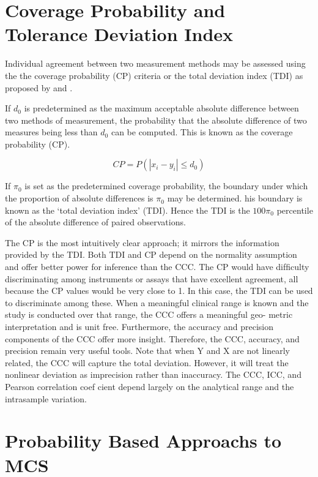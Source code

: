 \documentclass[12pt, a4paper]{report}
\theoremstyle{plain}
\theoremstyle{definition}
\theoremstyle{remark}
\begin{document}
\section{Coverage Probability and Tolerance Deviation Index}

Individual agreement between two measurement methods may be
assessed using the the coverage probability (CP) criteria or the
total deviation index (TDI) as proposed by \citet{lin2000} and
\citet{lin2002}.

If $d_{0}$ is predetermined as the maximum acceptable absolute
difference between two methods of measurement, the probability
that the absolute difference of two measures being less than
$d_{0}$ can be computed. This is known as the coverage probability
(CP).

\begin{equation}
CP = P(|x_{i} - y_{i}| \leq d_{0})
\end{equation}

If $\pi_{0}$ is set as the predetermined coverage probability, the
boundary under which the proportion of absolute differences is
$\pi_{0}$ may be determined. his boundary is known as the `total
deviation index' (TDI). Hence the TDI is the $100\pi_{0}$
percentile of the absolute difference of paired observations.


The CP is the most intuitively clear approach; it mirrors the information provided by the TDI. 
Both TDI and CP depend on the normality assumption and offer better power
for inference than the CCC. The CP would have difficulty discriminating among instruments or 
assays that have excellent agreement, all because the CP values would be very close to
1. In this case, the TDI can be used to discriminate among these. When a meaningful clinical range is known and the study is conducted over that range, the CCC offers a meaningful geo- metric interpretation and is unit free. Furthermore, the accuracy and precision components of the CCC offer more insight. Therefore, the CCC, accuracy, and precision remain very useful tools. Note that when Y and X are not linearly related, the CCC will capture the total deviation. However, it will treat the nonlinear deviation as imprecision rather than inaccuracy. The CCC, ICC, and Pearson correlation coef cient depend
largely on the analytical range and the intrasample variation.


\section{Probability Based Approachs to MCS}
\end{document}
